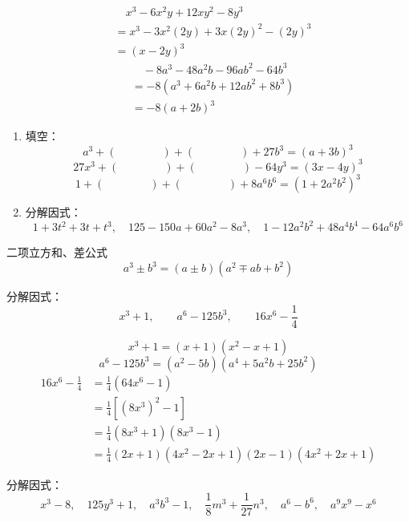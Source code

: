 \begin{solution}
\[\begin{split}
      &\quad       x^3-6x^2y+12xy^2-8y^3\\
      &=x^3-3x^2(2y)+3x(2y)^2-(2y)^3\\
      &=(x-2y)^3
        \end{split}\]
 \[\begin{split}
            &\quad -8a^3-48a^2b-96ab^2-64b^3\\
&=-8(a^3+6a^2b+12ab^2+8b^3)\\
&=-8(a+2b)^3
        \end{split}\]
  
\end{solution}

\begin{ex}
\begin{enumerate}
    \item 填空：
    \[a^3+(\qquad \qquad)+(\qquad\qquad )+27b^3=(a+3b)^3\]
    \[27x^3+(\qquad\qquad)+(\qquad\qquad )-64y^3=(3x-4y)^3\]
    \[1+(\qquad\qquad)+(\qquad\qquad)+8a^6b^6=(1+2a^2b^2)^3\]

\item 分解因式：
\[1+3t^2+3t+t^3,\quad 125-150a+60a^2-8a^3,\quad 1-12a^2b^2+48a^4b^4-64a^6b^6\]
\end{enumerate}    
\end{ex}

\begin{blk}{二项立方和、差公式}
    \[a^3\pm b^3 =(a\pm b)(a^2\mp ab+b^2)\]
\end{blk}

\begin{example}
分解因式：
\[x^3+1,\qquad a^6-125b^3,\qquad 16x^6-\frac{1}{4}\]
\end{example}

\begin{solution}
\[x^3+1=(x+1)(x^2-x+1)\]
\[a^6-125b^3=(a^2-5b)(a^4+5a^2b+25b^2)\]
\[\begin{split}
    16x^6-\frac{1}{4}&=\frac{1}{4}(64x^6-1)\\
    &=\frac{1}{4}\left[(8x^3)^2-1\right]\\
    &=\frac{1}{4}(8x^3+1)(8x^3-1)\\
    &=\frac{1}{4}(2x+1)(4x^2-2x+1)(2x-1)(4x^2+2x+1)
\end{split}\]
\end{solution}

\begin{ex}
    分解因式：
\[x^3-8,\quad 125y^3+1,\quad  a^3b^3-1,\quad \frac{1}{8}m^3+\frac{1}{27}n^3,\quad a^6-b^6,\quad a^9x^9-x^6\]
\end{ex}

